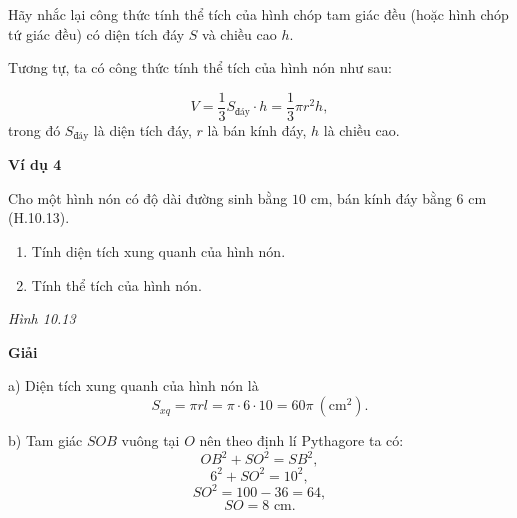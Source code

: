     Hãy nhắc lại công thức tính thể tích của hình chóp tam giác đều (hoặc hình chóp tứ giác đều) có diện tích đáy $S$ và chiều cao $h$.

    \answerline

    Tương tự, ta có công thức tính thể tích của hình nón như sau:

    \begin{keyconcept}
        \[
            V=\dfrac{1}{3}S_{\text{đáy}}\cdot h=\dfrac{1}{3}\pi r^2h,
        \]
        trong đó $S_{\text{đáy}}$ là diện tích đáy, $r$ là bán kính đáy, $h$ là chiều cao.
    \end{keyconcept}

    \textbf{Ví dụ 4}

    Cho một hình nón có độ dài đường sinh bằng $10$ cm, bán kính đáy bằng $6$ cm (H.10.13).
    \begin{enumerate}[label=\alph*)]
        \item Tính diện tích xung quanh của hình nón.
        \item Tính thể tích của hình nón.
    \end{enumerate}

    \begin{center}

        \textit{Hình 10.13}
    \end{center}

    \textbf{Giải}

    a) Diện tích xung quanh của hình nón là
    \[
        S_{xq}=\pi rl=\pi\cdot 6\cdot 10=60\pi\ (\text{cm}^2).
    \]

    b) Tam giác $SOB$ vuông tại $O$ nên theo định lí Pythagore ta có:
    \[
        OB^2+SO^2=SB^2,
    \]
    \[
        6^2+SO^2=10^2,
    \]
    \[
        SO^2=100-36=64,
    \]
    \[
        SO=8\text{ cm}.
    \]

